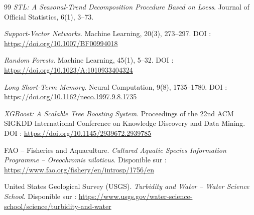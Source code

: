 \documentclass[a4paper,12pt, oneside]{article}
\begin{document}
\begin{thebibliography}{99}
\textit{STL: A Seasonal-Trend Decomposition Procedure Based on Loess}. Journal of Official Statistics, 6(1), 3--73.

\textit{Support-Vector Networks}. Machine Learning, 20(3), 273--297. DOI : \url{https://doi.org/10.1007/BF00994018}

\textit{Random Forests}. Machine Learning, 45(1), 5--32. DOI : \url{https://doi.org/10.1023/A:1010933404324}

\textit{Long Short-Term Memory}. Neural Computation, 9(8), 1735--1780. DOI : \url{https://doi.org/10.1162/neco.1997.9.8.1735}

\textit{XGBoost: A Scalable Tree Boosting System}. Proceedings of the 22nd ACM SIGKDD International Conference on Knowledge Discovery and Data Mining. DOI : \url{https://doi.org/10.1145/2939672.2939785}

FAO -- Fisheries and Aquaculture.
\newline \textit{Cultured Aquatic Species Information Programme -- Oreochromis niloticus}. Disponible sur : \url{https://www.fao.org/fishery/en/introsp/1756/en}

United States Geological Survey (USGS).
\newline \textit{Turbidity and Water -- Water Science School}. Disponible sur : \url{https://www.usgs.gov/water-science-school/science/turbidity-and-water}

\end{thebibliography}

\newpage
\end{document}
